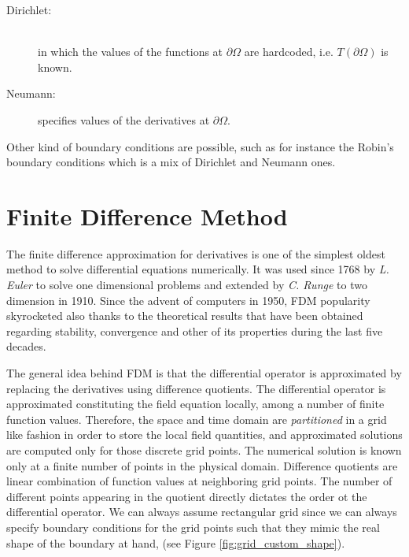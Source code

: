 \begin{description}
	\item [Dirichlet:] \hfil \\ in which the values of the functions at $\partial \Omega$ are hardcoded, i.e. $T(\partial \Omega)$  is known.
	
	\item [Neumann:] specifies values of the derivatives at $\partial \Omega$.
	
\end{description} 
Other kind of boundary conditions are possible, such as for instance the Robin's boundary conditions which is a mix of Dirichlet and Neumann ones.

    \section{Finite Difference Method}
The finite difference approximation for derivatives is one of the simplest oldest method to solve differential equations numerically. It was used since 1768 by \textit{L. Euler} to solve one dimensional problems and extended by \textit{C. Runge} to two dimension in 1910. Since the advent of computers in 1950, FDM  popularity skyrocketed also thanks to the theoretical results that have been obtained regarding stability, convergence and other of its properties during the last five decades.

The general idea behind FDM is that the differential operator is approximated by replacing the derivatives using difference quotients. The differential operator is approximated constituting the field equation locally, among a number of finite function values. Therefore, the space and time domain are \textit{partitioned} in a grid like fashion in order to store the local field quantities, and approximated solutions are computed only for those discrete grid points. The numerical solution is known only at a finite number of points in the physical domain. 
Difference quotients are linear combination of function values at neighboring grid points. The number of different points appearing in the quotient directly dictates the order ot the differential operator.
We can always assume rectangular grid since we can always  specify boundary conditions for the grid points such that they mimic the real shape of the boundary at hand, (see Figure \ref{fig:grid_custom_shape}). 

